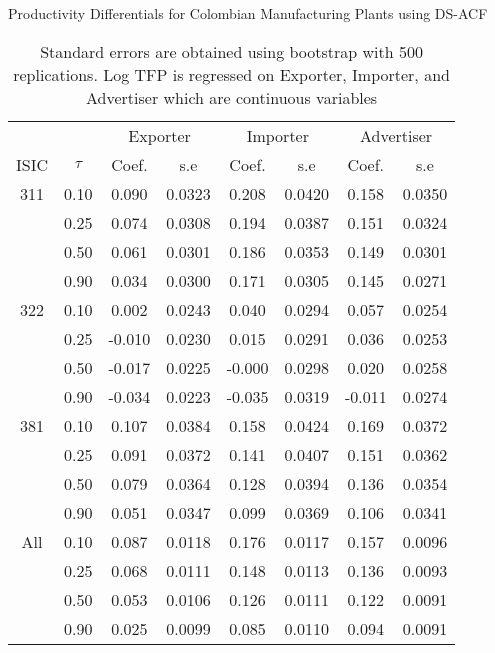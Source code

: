 \documentclass[11pt]{article}
\begin{document}
\begin{table}[H]
\centering
\caption{Productivity Differentials for Colombian Manufacturing Plants using DS-ACF}
\begin{tabular}{cccccccc}
  \hline\hline & & \multicolumn{2}{c}{Exporter}  & \multicolumn{2}{c}{Importer} & \multicolumn{2}{c}{Advertiser} \\ \cmidrule(lr){3-4} \cmidrule(lr){5-6} \cmidrule(lr){7-8}ISIC & $\tau$ & Coef. & s.e & Coef. & s.e & Coef. & s.e \\ 
  \hline
311 & 0.10 & 0.090 & 0.0323 & 0.208 & 0.0420 & 0.158 & 0.0350 \\ 
   & 0.25 & 0.074 & 0.0308 & 0.194 & 0.0387 & 0.151 & 0.0324 \\ 
   & 0.50 & 0.061 & 0.0301 & 0.186 & 0.0353 & 0.149 & 0.0301 \\ 
   & 0.90 & 0.034 & 0.0300 & 0.171 & 0.0305 & 0.145 & 0.0271 \\ 
  322 & 0.10 & 0.002 & 0.0243 & 0.040 & 0.0294 & 0.057 & 0.0254 \\ 
   & 0.25 & -0.010 & 0.0230 & 0.015 & 0.0291 & 0.036 & 0.0253 \\ 
   & 0.50 & -0.017 & 0.0225 & -0.000 & 0.0298 & 0.020 & 0.0258 \\ 
   & 0.90 & -0.034 & 0.0223 & -0.035 & 0.0319 & -0.011 & 0.0274 \\ 
  381 & 0.10 & 0.107 & 0.0384 & 0.158 & 0.0424 & 0.169 & 0.0372 \\ 
   & 0.25 & 0.091 & 0.0372 & 0.141 & 0.0407 & 0.151 & 0.0362 \\ 
   & 0.50 & 0.079 & 0.0364 & 0.128 & 0.0394 & 0.136 & 0.0354 \\ 
   & 0.90 & 0.051 & 0.0347 & 0.099 & 0.0369 & 0.106 & 0.0341 \\ 
  All & 0.10 & 0.087 & 0.0118 & 0.176 & 0.0117 & 0.157 & 0.0096 \\ 
   & 0.25 & 0.068 & 0.0111 & 0.148 & 0.0113 & 0.136 & 0.0093 \\ 
   & 0.50 & 0.053 & 0.0106 & 0.126 & 0.0111 & 0.122 & 0.0091 \\ 
   & 0.90 & 0.025 & 0.0099 & 0.085 & 0.0110 & 0.094 & 0.0091 \\ 
   \hline
\end{tabular}
\caption*{Standard errors are obtained using bootstrap with 500 replications. Log TFP is regressed on Exporter, Importer, and Advertiser  which are continuous variables }
\end{table}
\end{document}
